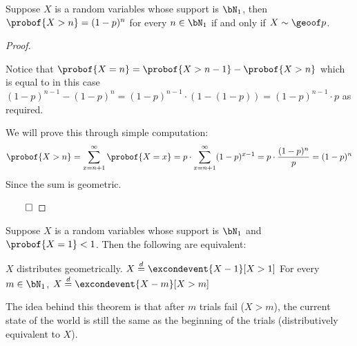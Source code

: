 \begin{lemm*}

	Suppose $X$ is a random variables whose support is $\bN_1$, then $\probof{X>n}=(1-p)^n$ for every $n\in\bN_1$ if and
	only if $X\sim\geoof p$.

\end{lemm*}

\begin{proof}

	\begin{multiparitemize}[0pt]
		\paritem{$(\implies)$} Notice that $\probof{X=n}=\probof{X>n-1} - \probof{X>n}$ which is equal to in this case
			$(1-p)^{n-1} - (1-p)^n = (1-p)^{n-1}\cdot(1-(1-p)) = (1-p)^{n-1}\cdot p$ as required.

		\paritem{$(\impliedby)$} We will prove this through simple computation:
			\[ \probof{X>n} = \sum_{x=n+1}^\infty\probof{X=x} = p\cdot\sum_{x=n+1}^\infty (1-p)^{x-1} =
			p\cdot\frac{(1-p)^n}p = (1-p)^n \]
			Since the sum is geometric.
	\end{multiparitemize}

	\hfill$\qed$

\end{proof}

\begin{thrm*}

	Suppose $X$ is a random variables whose support is $\bN_1$ and $\probof{X=1}<1$.
	Then the following are equivalent:
	\begin{msecenumerate}
		\mitem $X$ distributes geometrically.
		\mitem $X\deq\excondevent{X-1}[X>1]$
		\mitem For every $m\in\bN_1$, $X\deq\excondevent{X-m}[X>m]$
	\end{msecenumerate}

\end{thrm*}

The idea behind this theorem is that after $m$ trials fail ($X>m$), the current state of the world is still the same as the
beginning of the trials (distributively equivalent to $X$).

